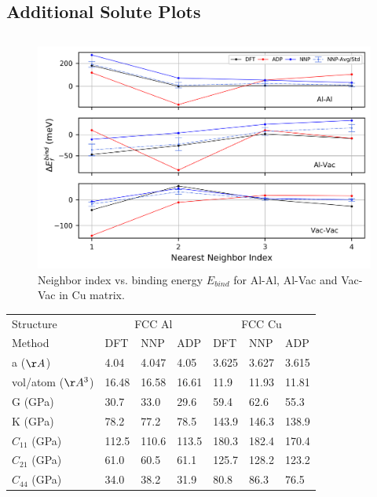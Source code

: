 \documentclass{article}
\begin{document}
\subsection{Additional Solute Plots} \label{sct:adn_solsol}
\subsection{}
\begin{figure}[H]%
\centering%
\includegraphics[width=1\textwidth,center]{./figures/solsol_in_cu.png}%
\caption{Neighbor index vs. binding energy $E_{bind}$ for Al-Al, Al-Vac and Vac-Vac in Cu matrix.}%
\label{fig:solsol_in_cu}
\end{figure}



\begin{tabular}{l|lll|lll}%
\hline%
Structure&\multicolumn{3}{c}{FCC Al}&\multicolumn{3}{c}{FCC Cu}\\%
Method&DFT&NNP&ADP&DFT&NNP&ADP\\%
\hline%
a ($\AA$)&4.04&4.047&4.05&3.625&3.627&3.615\\%
vol/atom ($\AA^3$)&16.48&16.58&16.61&11.9&11.93&11.81\\%
G (GPa)&30.7&33.0&29.6&59.4&62.6&55.3\\%
K (GPa)&78.2&77.2&78.5&143.9&146.3&138.9\\%
$C_{11}$ (GPa)&112.5&110.6&113.5&180.3&182.4&170.4\\%
$C_{21}$ (GPa)&61.0&60.5&61.1&125.7&128.2&123.2\\%
$C_{44}$ (GPa)&34.0&38.2&31.9&80.8&86.3&76.5\\%
\hline%
\end{tabular}%
\newline%
\newline%
\newline%
\newline%
\end{document}
